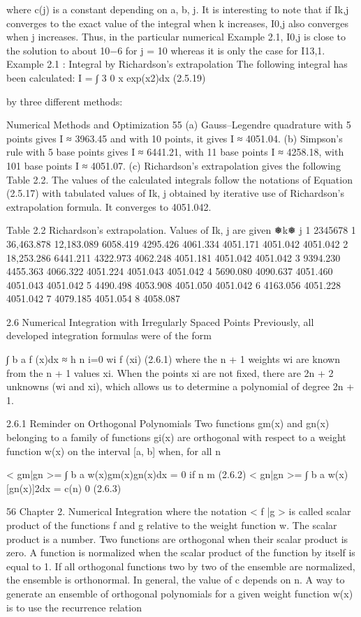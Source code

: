 \documentclass[letterpaper,12pt]{article}
\begin{document}
where c(j) is a constant depending on a, b, j.
It is interesting to note that if Ik,j converges to the exact value of the integral when
k increases, I0,j also converges when j increases. Thus, in the particular numerical
Example 2.1, I0,j is close to the solution to about 10−6 for j = 10 whereas it is only
the case for I13,1.
Example 2.1 :
Integral by Richardson’s extrapolation
The following integral has been calculated:
I =
∫ 3
0
x exp(x2)dx (2.5.19)

by three different methods:

Numerical Methods and Optimization 55
(a) Gauss–Legendre quadrature with 5 points gives I ≈ 3963.45 and with 10 points, it gives I ≈
4051.04.
(b) Simpson’s rule with 5 base points gives I ≈ 6441.21, with 11 base points I ≈ 4258.18, with 101
base points I ≈ 4051.07.
(c) Richardson’s extrapolation gives the following Table 2.2. The values of the calculated integrals
follow the notations of Equation (2.5.17) with tabulated values of Ik, j obtained by iterative use of
Richardson’s extrapolation formula. It converges to 4051.042.

Table 2.2 Richardson’s extrapolation. Values of Ik, j are given
❅k❅
j 1 2345678
1 36,463.878 12,183.089 6058.419 4295.426 4061.334 4051.171 4051.042 4051.042
2 18,253.286 6441.211 4322.973 4062.248 4051.181 4051.042 4051.042
3 9394.230 4455.363 4066.322 4051.224 4051.043 4051.042
4 5690.080 4090.637 4051.460 4051.043 4051.042
5 4490.498 4053.908 4051.050 4051.042
6 4163.056 4051.228 4051.042
7 4079.185 4051.054
8 4058.087

2.6 Numerical Integration with Irregularly Spaced Points
Previously, all developed integration formulas were of the form

∫ b
a
f (x)dx ≈ h
n
i=0
wi f (xi) (2.6.1)
where the n + 1 weights wi are known from the n + 1 values xi. When the points xi
are not fixed, there are 2n + 2 unknowns (wi and xi), which allows us to determine a
polynomial of degree 2n + 1.

2.6.1 Reminder on Orthogonal Polynomials
Two functions gm(x) and gn(x) belonging to a family of functions gi(x) are orthogonal
with respect to a weight function w(x) on the interval [a, b] when, for all n

< gm|gn >=
∫ b
a
w(x)gm(x)gn(x)dx = 0 if n  m (2.6.2)
< gn|gn >=
∫ b
a
w(x)[gn(x)]2dx = c(n)  0 (2.6.3)

56 Chapter 2. Numerical Integration
where the notation < f |g > is called scalar product of the functions f and g relative to
the weight function w. The scalar product is a number. Two functions are orthogonal
when their scalar product is zero. A function is normalized when the scalar product
of the function by itself is equal to 1. If all orthogonal functions two by two of the
ensemble are normalized, the ensemble is orthonormal. In general, the value of c
depends on n.
A way to generate an ensemble of orthogonal polynomials for a given weight
function w(x) is to use the recurrence relation
\end{document}
